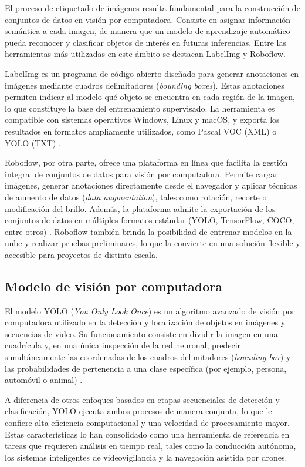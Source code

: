 El proceso de etiquetado de imágenes resulta fundamental para la construcción de conjuntos de datos en visión por computadora. Consiste en asignar información semántica a cada imagen, de manera que un modelo de aprendizaje automático pueda reconocer y clasificar objetos de interés en futuras inferencias. Entre las herramientas más utilizadas en este ámbito se destacan LabelImg y Roboflow.  

LabelImg es un programa de código abierto diseñado para generar anotaciones en imágenes mediante cuadros delimitadores (\textit{bounding boxes}). Estas anotaciones permiten indicar al modelo qué objeto se encuentra en cada región de la imagen, lo que constituye la base del entrenamiento supervisado. La herramienta es compatible con sistemas operativos Windows, Linux y macOS, y exporta los resultados en formatos ampliamente utilizados, como Pascal VOC (XML) o YOLO (TXT) \citep{WEBSITE:LabelImg}.

Roboflow, por otra parte, ofrece una plataforma en línea que facilita la gestión integral de conjuntos de datos para visión por computadora. Permite cargar imágenes, generar anotaciones directamente desde el navegador y aplicar técnicas de aumento de datos (\textit{data augmentation}), tales como rotación, recorte o modificación del brillo. Además, la plataforma admite la exportación de los conjuntos de datos en múltiples formatos estándar (YOLO, TensorFlow, COCO, entre otros) \citep{WEBSITE:Roboflow}. Roboflow también brinda la posibilidad de entrenar modelos en la nube y realizar pruebas preliminares, lo que la convierte en una solución flexible y accesible para proyectos de distinta escala.  

\subsection{Modelo de visión por computadora}
\label{subsec:YOLO}

El modelo YOLO (\textit{You Only Look Once}) es un algoritmo avanzado de visión por computadora utilizado en la detección y localización de objetos en imágenes y secuencias de video. Su funcionamiento consiste en dividir la imagen en una cuadrícula y, en una única inspección de la red neuronal, predecir simultáneamente las coordenadas de los cuadros delimitadores (\textit{bounding box}) y las probabilidades de pertenencia a una clase específica (por ejemplo, persona, automóvil o animal) \citep{WEBSITE:YOLO}.

A diferencia de otros enfoques basados en etapas secuenciales de detección y clasificación, YOLO ejecuta ambos procesos de manera conjunta, lo que le confiere alta eficiencia computacional y una velocidad de procesamiento mayor. Estas características lo han consolidado como una herramienta de referencia en tareas que requieren análisis en tiempo real, tales como la conducción autónoma, los sistemas inteligentes de videovigilancia y la navegación asistida por drones.

